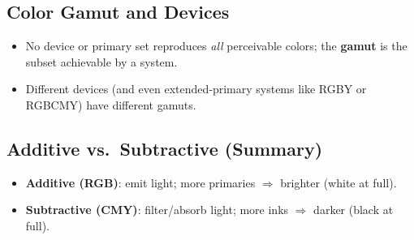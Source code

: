 \documentclass[10pt,twocolumn]{extarticle}
\begin{document}
\subsection*{Color Gamut and Devices}
\begin{itemize}
  \item No device or primary set reproduces \emph{all} perceivable colors; the \textbf{gamut} is the subset achievable by a system.
  \item Different devices (and even extended‐primary systems like RGBY or RGBCMY) have different gamuts.
\end{itemize}

\subsection*{Additive vs.\ Subtractive (Summary)}
\begin{itemize}
  \item \textbf{Additive (RGB)}: emit light; more primaries $\Rightarrow$ brighter (white at full).
  \item \textbf{Subtractive (CMY)}: filter/absorb light; more inks $\Rightarrow$ darker (black at full).
\end{itemize}
\end{document}
